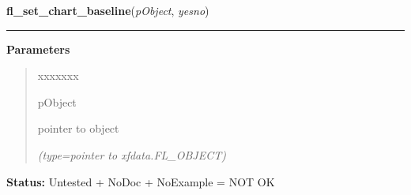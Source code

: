 \hspace{.8\funcindent}\begin{boxedminipage}{\funcwidth}

    \raggedright \textbf{fl\_set\_chart\_baseline}(\textit{pObject}, \textit{yesno})

    \vspace{-1.5ex}

    \rule{\textwidth}{0.5\fboxrule}
\setlength{\parskip}{2ex}
\setlength{\parskip}{1ex}
      \textbf{Parameters}
      \vspace{-1ex}

      \begin{quote}
        \begin{Ventry}{xxxxxxx}

          \item[pObject]

          pointer to object

            {\it (type=pointer to xfdata.FL\_OBJECT)}

        \end{Ventry}

      \end{quote}

\textbf{Status:} Untested + NoDoc + NoExample = NOT OK



    \end{boxedminipage}

    \label{xformslib:library:fl_set_chart_lcolor}

    \vspace{0.5ex}

